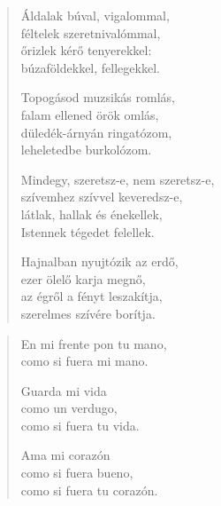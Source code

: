 \documentclass[11pt]{book}
\newcommand*{\centeredornament}{\centerline{\pgfornament[width=6cm]{88}}}
\begin{document}
\newpage

\vspace*{-15mm}
\centeredornament



\begin{verse}
  Áldalak búval, vigalommal, \\
  féltelek szeretnivalómmal, \\
  őrizlek kérő tenyerekkel: \\
  búzaföldekkel, fellegekkel.

  Topogásod muzsikás romlás, \\
  falam ellened örök omlás, \\
  düledék-árnyán ringatózom, \\
  leheletedbe burkolózom.

  Mindegy, szeretsz-e, nem szeretsz-e, \\
  szívemhez szívvel keveredsz-e, \\
  látlak, hallak és énekellek, \\
  Istennek tégedet felellek.

  Hajnalban nyujtózik az erdő, \\
  ezer ölelő karja megnő, \\
  az égről a fényt leszakítja, \\
  szerelmes szívére borítja.
\end{verse}

\newpage

\vspace*{-15mm}
\centeredornament



\begin{verse}
  En mi frente pon tu mano, \\
  como si fuera mi mano.

  Guarda mi vida \\
  como un verdugo, \\
  como si fuera tu vida.

  Ama mi corazón \\
  como si fuera bueno, \\
  como si fuera tu corazón.
\end{verse}

\newpage

\vspace*{-15mm}
\centeredornament
\end{document}
